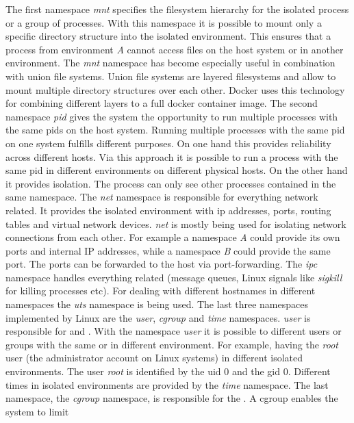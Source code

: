\documentclass[titlepage]{report}
\begin{document}
The first namespace \emph{mnt} specifies the filesystem hierarchy for the isolated process or a group of processes. With this namespace it is possible
to mount only a specific directory structure into the isolated environment. This ensures that a process from environment \emph{A} cannot
access files on the host system or in another environment. The \emph{mnt} namespace has become especially useful in combination with union file systems.
Union file systems are layered filesystems and allow to mount multiple directory structures over each other. Docker uses this technology for combining
different layers to a full docker container image. The second namespace \emph{pid} gives the system the opportunity to run multiple processes 
with the same \glspl{pid} on the host system. Running multiple processes with the same \gls{pid} on one system fulfills different purposes.
On one hand this provides reliability across different hosts. Via this approach it is possible to run a process with the same \gls{pid} in different
environments on different physical hosts. On the other hand it provides isolation. The process can only see other processes contained in the same namespace\cite{lwnnamespace}.
The \emph{net} namespace is responsible for everything network related. It provides the isolated environment with \gls{ip} addresses, ports, routing tables
and virtual network devices. \emph{net} is mostly being used for isolating network connections from each other. For example a namespace \emph{A} could provide
its own ports and internal IP addresses, while a namespace \emph{B} could provide the same port. The ports can be forwarded to the host via port-forwarding.
The \emph{ipc} namespace handles everything  related (message queues, Linux signals like \emph{sigkill} for killing processes etc).
For dealing with different hostnames in different namespaces the \emph{uts} namespace is being used. The last three namespaces implemented by Linux
are the \emph{user}, \emph{cgroup} and \emph{time} namespaces. \emph{user} is responsible for  and . With
the namespace \emph{user} it is possible to different users or groups with the same  or  in different environment.
For example, having the \emph{root} user (the administrator account on Linux systems) in different isolated environments. The user \emph{root}
is identified by the \gls{uid} 0 and the \gls{gid} 0. Different times in isolated environments are provided by the \emph{time} namespace.
The last namespace, the \emph{cgroup} namespace, is responsible for the . A \gls{cgroup} enables the system to limit
\end{document}
